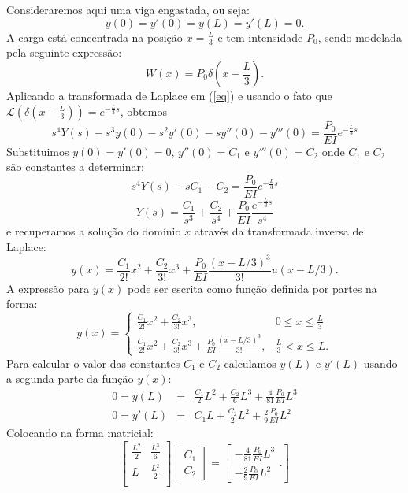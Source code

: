 \documentclass[a4paper,10pt]{book}
\begin{document}
Consideraremos aqui uma viga engastada, ou seja: \begin{equation}y(0)=y'(0)=y(L)=y'(L)=0.\end{equation}
A carga está concentrada na posição $x=\frac{L}{3}$ e tem intensidade $P_0$, sendo modelada pela seguinte expressão:
\begin{equation}W(x)=P_0\delta\left(x-\frac{L}{3}\right).\end{equation}
Aplicando a transformada de Laplace em (\ref{eq}) e usando o fato que $\mathcal{L}\left(\delta\left(x-\frac{L}{3}\right)\right)=e^{-\frac{L}{3}s}$, obtemos
\begin{equation}s^4Y(s)-s^3y(0)-s^2y'(0)-sy''(0)-y'''(0)=\frac{P_0}{EI}e^{-\frac{L}{3}s}\end{equation}
 Substituimos $y(0)=y'(0)=0$, $y''(0)=C_1$ e $y'''(0)=C_2$ onde $C_1$ e $C_2$ são constantes a determinar:
 \begin{equation}s^4Y(s)-sC_1-C_2=\frac{P_0}{EI}e^{-\frac{L}{3}s}\end{equation}
 \begin{equation}Y(s)=\frac{C_1}{s^3}+\frac{C_2}{s^4}+\frac{P_0}{EI}\frac{e^{-\frac{L}{3}s}}{s^4}\end{equation}
 e recuperamos a solução do domínio $x$ através da transformada inversa de Laplace:
 \begin{equation}y(x)=\frac{C_1}{2!}x^2+\frac{C_2}{3!}x^3+\frac{P_0}{EI}\frac{(x-L/3)^3}{3!}u(x-L/3).\end{equation}
 A expressão para $y(x)$ pode ser escrita como função definida por partes na forma:
 \begin{equation}y(x)=\left\{\begin{array}{ll}\frac{C_1}{2!}x^2+\frac{C_2}{3!}x^3,&0\leq x\leq\frac{L}{3} \\ \frac{C_1}{2!}x^2+\frac{C_2}{3!}x^3+\frac{P_0}{EI}\frac{(x-L/3)^3}{3!},&\frac{L}{3}<x\leq L .\end{array}\right.\end{equation}
 Para calcular o valor das constantes $C_1$ e $C_2$ calculamos  $y(L)$ e $y'(L)$ usando a segunda parte da função $y(x)$:
 \begin{eqnarray*}
 0=y(L)&=&\frac{C_1}{2}L^2+\frac{C_2}{6}L^3+\frac{4}{81}\frac{P_0}{EI}L^3\\
 0=y'(L)&=&C_1 L+\frac{C_2}{2}L^2+\frac{2}{9}\frac{P_0}{EI}L^2
 \end{eqnarray*}
 Colocando na forma matricial:
 \begin{equation}\left[\begin{array}{cc}
 \frac{L^2}{2} & \frac{L^3}{6}\\
L & \frac{L^2}{2}\\
 \end{array}
 \right]\left[\begin{array}{c}
 C_1\\
 C_2\end{array}
\right]=\left[\begin{array}{c}
-\frac{4}{81}\frac{P_0}{EI}L^3\\
-\frac{2}{9}\frac{P_0}{EI}L^2\end{array}.
\right]
\end{equation}
\end{document}
